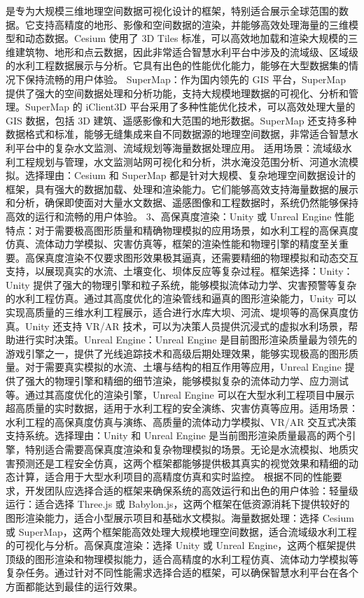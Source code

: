 {是专为大规模三维地理空间数据可视化设计的框架，特别适合展示全球范围的数据。它支持高精度的地形、影像和空间数据的渲染，并能够高效处理海量的三维模型和动态数据。Cesium 使用了 3D Tiles
标准，可以高效地加载和渲染大规模的三维建筑物、地形和点云数据，因此非常适合智慧水利平台中涉及的流域级、区域级的水利工程数据展示与分析。它具有出色的性能优化能力，能够在大型数据集的情况下保持流畅的用户体验。 SuperMap：作为国内领先的
GIS 平台，SuperMap 提供了强大的空间数据处理和分析功能，支持大规模地理数据的可视化、分析和管理。SuperMap 的 iClient3D 平台采用了多种性能优化技术，可以高效处理大量的 GIS 数据，包括 3D
建筑、遥感影像和大范围的地形数据。SuperMap 还支持多种数据格式和标准，能够无缝集成来自不同数据源的地理空间数据，非常适合智慧水利平台中的复杂水文监测、流域规划等海量数据处理应用。
适用场景：流域级水利工程规划与管理，水文监测站网可视化和分析，洪水淹没范围分析、河道水流模拟。选择理由：Cesium 和 SuperMap
都是针对大规模、复杂地理空间数据设计的框架，具有强大的数据加载、处理和渲染能力。它们能够高效支持海量数据的展示和分析，确保即使面对大量水文数据、遥感图像和工程数据时，系统仍然能够保持高效的运行和流畅的用户体验。 3、高保真度渲染：Unity
或 Unreal Engine
性能特点：对于需要极高图形质量和精确物理模拟的应用场景，如水利工程的高保真度仿真、流体动力学模拟、灾害仿真等，框架的渲染性能和物理引擎的精度至关重要。高保真度渲染不仅要求图形效果极其逼真，还需要精细的物理模拟和动态交互支持，以展现真实的水流、土壤变化、坝体反应等复杂过程。框架选择：Unity：Unity
提供了强大的物理引擎和粒子系统，能够模拟流体动力学、灾害预警等复杂的水利工程仿真。通过其高度优化的渲染管线和逼真的图形渲染能力，Unity 可以实现高质量的三维水利工程展示，适合进行水库大坝、河流、堤坝等的高保真度仿真。Unity 还支持
VR/AR 技术，可以为决策人员提供沉浸式的虚拟水利场景，帮助进行实时决策。Unreal Engine：Unreal Engine
是目前图形渲染质量最为领先的游戏引擎之一，提供了光线追踪技术和高级后期处理效果，能够实现极高的图形质量。对于需要真实模拟的水流、土壤与结构的相互作用等应用，Unreal Engine
提供了强大的物理引擎和精细的细节渲染，能够模拟复杂的流体动力学、应力测试等。通过其高度优化的渲染引擎，Unreal Engine
可以在大型水利工程项目中展示超高质量的实时数据，适用于水利工程的安全演练、灾害仿真等应用。适用场景：水利工程的高保真度仿真与演练、高质量的流体动力学模拟、VR/AR 交互式决策支持系统。选择理由：Unity 和 Unreal Engine
是当前图形渲染质量最高的两个引擎，特别适合需要高保真度渲染和复杂物理模拟的场景。无论是水流模拟、地质灾害预测还是工程安全仿真，这两个框架都能够提供极其真实的视觉效果和精细的动态计算，适合用于大型水利项目的高精度仿真和实时监控。
根据不同的性能要求，开发团队应选择合适的框架来确保系统的高效运行和出色的用户体验：轻量级运行：适合选择 Three.js 或
Babylon.js，这两个框架在低资源消耗下提供较好的图形渲染能力，适合小型展示项目和基础水文模拟。海量数据处理：选择 Cesium 或
SuperMap，这两个框架能高效处理大规模地理空间数据，适合流域级水利工程的可视化与分析。高保真度渲染：选择 Unity 或 Unreal
Engine，这两个框架提供顶级的图形渲染和物理模拟能力，适合高精度的水利工程仿真、流体动力学模拟等复杂任务。通过针对不同性能需求选择合适的框架，可以确保智慧水利平台在各个方面都能达到最佳的运行效果。
}

